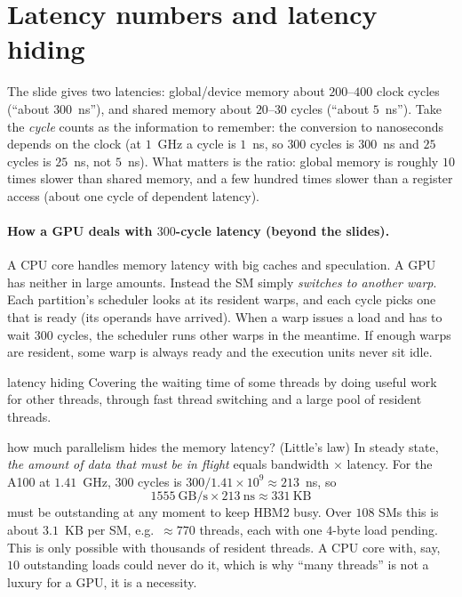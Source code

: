 \section{Latency numbers and latency hiding}
\label{sec:latency}


The slide gives two latencies: global/device memory about $200$--$400$ clock cycles (``about $300$~ns''), and shared memory about $20$--$30$ cycles (``about $5$~ns'').
Take the \emph{cycle} counts as the information to remember: the conversion to nanoseconds depends on the clock (at $1$~GHz a cycle is $1$~ns,
so $300$ cycles is $300$~ns and $25$ cycles is $25$~ns, not $5$~ns). What matters is the ratio: global memory is roughly $10$ times slower than shared memory, and a few hundred times slower than a register access (about one cycle of dependent latency).

\paragraph{How a GPU deals with $300$-cycle latency (beyond the slides).}
A CPU core handles memory latency with big caches and speculation. A GPU has neither in large amounts. Instead the SM simply \emph{switches to another warp}.
Each partition's scheduler looks at its resident warps, and each cycle picks one that is ready (its operands have arrived). When a warp issues a load and has to wait $300$ cycles, the scheduler runs other warps in the meantime.
If enough warps are resident, some warp is always ready and the execution units never sit idle.
\begin{definition}{latency hiding}
Covering the waiting time of some threads by doing useful work for other threads, through fast thread switching and a large pool of resident threads.
\end{definition}

\begin{workedex}{how much parallelism hides the memory latency? (Little's law)}
In steady state, \emph{the amount of data that must be in flight} equals bandwidth $\times$ latency. For the A100 at $1.41$~GHz,
$300$ cycles is $300/1.41\times10^{9}\approx213$~ns, so
\[
 1555\ \text{GB/s}\times213\ \text{ns}\approx331\ \text{KB}
\]
must be outstanding at any moment to keep HBM2 busy. Over $108$ SMs this is about $3.1$~KB per SM, e.g.\ $\approx 770$ threads, each with one $4$-byte load pending.
This is only possible with thousands of resident threads. A CPU core with, say, $10$ outstanding loads could never do it, which is why ``many threads'' is not a luxury for a GPU, it is a necessity.
\end{workedex}

